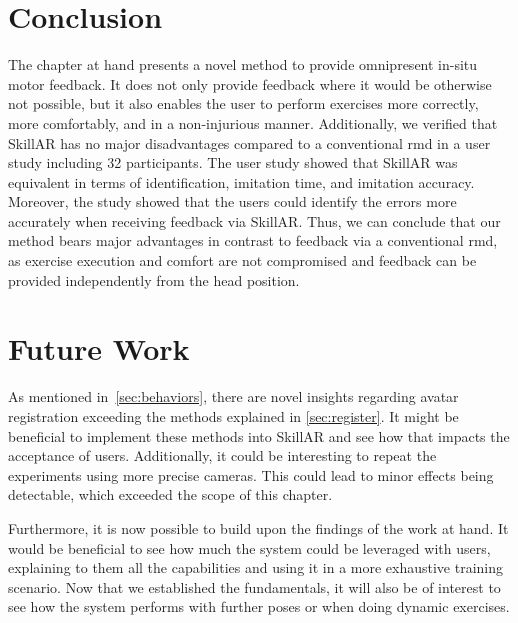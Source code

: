 \section{Conclusion}
The chapter at hand presents a novel method to provide omnipresent in-situ motor feedback. It does not only provide feedback where it would be otherwise not possible, but it also enables the user to perform exercises more correctly, more comfortably, and in a non-injurious manner. Additionally, we verified that SkillAR has no major disadvantages compared to a conventional \acrshort{rmd} in a user study including 32 participants. The user study showed that SkillAR was equivalent in terms of identification, imitation time, and imitation accuracy. Moreover, the study showed that the users could identify the errors more accurately when receiving feedback via SkillAR. Thus, we can conclude that our method bears major advantages in contrast to feedback via a conventional \acrshort{rmd}, as exercise execution and comfort are not compromised and feedback can be provided independently from the head position.

\section{Future Work}
As mentioned in~\autoref{sec:behaviors}, there are novel insights regarding avatar registration exceeding the methods explained in \autoref{sec:register}. It might be beneficial to implement these methods into SkillAR and see how that impacts the acceptance of users. Additionally, it could be interesting to repeat the experiments using more precise cameras. This could lead to minor effects being detectable, which exceeded the scope of this chapter.

Furthermore, it is now possible to build upon the findings of the work at hand. It would be beneficial to see how much the system could be leveraged with users, explaining to them all the capabilities and using it in a more exhaustive training scenario. Now that we established the fundamentals, it will also be of interest to see how the system performs with further poses or when doing dynamic exercises.